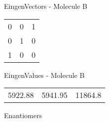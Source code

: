 \begin{multicols}{2}
\begin{center}
\vtab
 EingenVectors - Molecule B     \\
\vtab
\begin{tabular}{|c c c|}
0	 & 	0	 & 	1	 \\
0	 & 	1	 & 	0	 \\
1	 & 	0	 & 	0
\end{tabular}

\vtab
 EingenValues - Molecule B     \\
\vtab
\begin{tabular}{|c c c|}
5922.88	 & 	5941.95	 & 	11864.8	 \\
\end{tabular}

\end{center}
\end{multicols}
\begin{center}
\vtab
\vtab
\textcolor{NavyBlue}{\Large Enantiomers}
\end{center}

 \newpage

